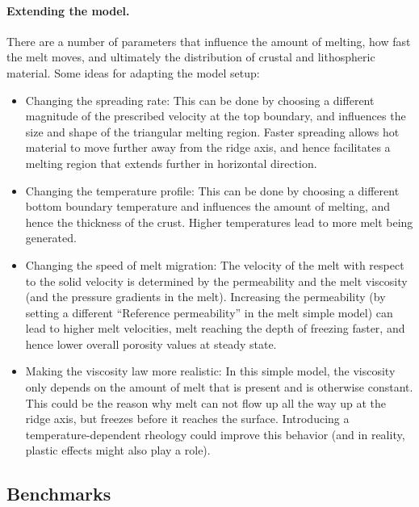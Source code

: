 \documentclass{article}
\begin{document}
\paragraph{Extending the model.}
There are a number of parameters that influence the amount of melting, how fast the melt moves, and ultimately the distribution of crustal and lithospheric material.
Some ideas for adapting the model setup:
\begin{itemize}
  \item Changing the spreading rate: This can be done by choosing a different magnitude of the
        prescribed velocity at the top boundary, and influences the size and shape of the triangular
        melting region. Faster spreading allows hot material to move further away from the ridge axis,
        and hence facilitates a melting region that extends further in horizontal direction.
  \item Changing the temperature profile: This can be done by choosing a different bottom boundary
        temperature and influences the amount of melting, and hence the thickness of the crust.
        Higher temperatures lead to more melt being generated.
  \item Changing the speed of melt migration: The velocity of the melt with respect to the solid velocity
        is determined by the permeability and the melt viscosity (and the pressure gradients in the melt).
        Increasing the permeability (by setting a different ``Reference permeability'' in the melt simple
        model) can lead to higher melt velocities, melt reaching the depth of freezing faster, and hence
        lower overall porosity values at steady state.
  \item Making the viscosity law more realistic: In this simple model, the viscosity only depends on the
        amount of melt that is present and is otherwise constant. This could be the reason why melt can
        not flow up all the way up at the ridge axis, but freezes before it reaches the surface.
        Introducing a temperature-dependent rheology could improve this behavior (and in reality, plastic
        effects might also play a role).
\end{itemize}




\subsection{Benchmarks}
\label{sec:cookbooks-benchmarks}
\end{document}
